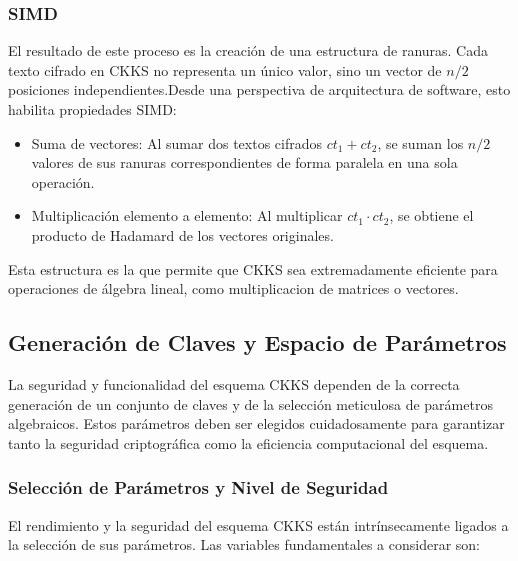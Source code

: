\subsubsection{SIMD}

El resultado de este proceso es la creación de una estructura de ranuras. Cada texto cifrado en CKKS no representa un único valor, sino un vector de $n/2$ posiciones independientes.Desde una perspectiva de arquitectura de software, esto habilita propiedades SIMD:

\begin{itemize}
\item Suma de vectores: Al sumar dos textos cifrados $ct_1 + ct_2$, se suman los $n/2$ valores de sus ranuras correspondientes de forma paralela en una sola operación.
\item Multiplicación elemento a elemento: Al multiplicar $ct_1 \cdot ct_2$, se obtiene el producto de Hadamard de los vectores originales.
\end{itemize}

Esta estructura es la que permite que CKKS sea extremadamente eficiente para operaciones de álgebra lineal, como multiplicacion de matrices o vectores.

\subsection{Generación de Claves y Espacio de Parámetros}

La seguridad y funcionalidad del esquema CKKS dependen de la correcta generación de un conjunto de claves y de la selección meticulosa de parámetros algebraicos. Estos parámetros deben ser elegidos cuidadosamente para garantizar tanto la seguridad criptográfica como la eficiencia computacional del esquema.

\subsubsection{Selección de Parámetros y Nivel de Seguridad}

El rendimiento y la seguridad del esquema CKKS están intrínsecamente ligados a la selección de sus parámetros. Las variables fundamentales a considerar son:

